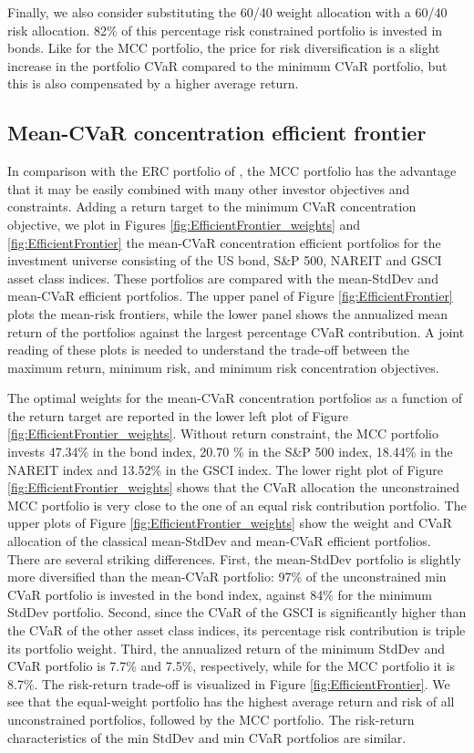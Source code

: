 \documentclass[12pt,a4paper]{article}
\begin{document}
Finally, we also consider substituting the 60/40 weight allocation with a 60/40 risk allocation.  82\% of this percentage risk constrained portfolio is invested in bonds. Like for the MCC portfolio, the price for risk diversification is a slight increase in the portfolio CVaR compared to the minimum CVaR portfolio, but this is also compensated by a higher average return.


\subsection{Mean-CVaR concentration efficient frontier}\label{subsec:efficientfrontiers}


In comparison with the ERC portfolio of \citet{Qian2005}, the MCC portfolio has the advantage that it may be easily combined with many other investor objectives and constraints. Adding a return target to the minimum CVaR concentration objective, we plot in  Figures \ref{fig:EfficientFrontier_weights}  and \ref{fig:EfficientFrontier}  the mean-CVaR concentration efficient portfolios for the investment universe consisting of the US bond, S\&P 500, NAREIT and GSCI asset class indices. These portfolios are compared with the mean-StdDev and mean-CVaR efficient portfolios. The upper panel of Figure \ref{fig:EfficientFrontier} plots the mean-risk frontiers, while the lower panel shows the annualized mean return of the portfolios against the largest percentage CVaR contribution. A joint reading of these plots is needed to understand the trade-off between the maximum return, minimum risk, and minimum risk concentration objectives.

The optimal weights for the mean-CVaR concentration portfolios as a function of the return target are reported in the lower left plot of Figure \ref{fig:EfficientFrontier_weights}. Without return constraint, the MCC portfolio invests 47.34\% in the bond index, 20.70 \% in the S\&P 500 index, 18.44\% in the NAREIT index and 13.52\% in the GSCI index. The lower right plot of Figure \ref{fig:EfficientFrontier_weights} shows that the CVaR allocation the unconstrained MCC portfolio is very close to the one of an equal risk contribution portfolio. The upper plots of Figure \ref{fig:EfficientFrontier_weights} show the weight and CVaR allocation of the classical mean-StdDev and mean-CVaR efficient portfolios. There are several striking differences. First, the mean-StdDev portfolio is slightly more diversified than the mean-CVaR portfolio: 97\% of the unconstrained min CVaR portfolio is invested in the bond index, against 84\% for the minimum StdDev portfolio. Second, since the CVaR of the GSCI is significantly higher than the CVaR of the other asset class indices, its percentage risk contribution is triple its portfolio weight.
Third, the annualized return of the minimum StdDev and CVaR portfolio is 7.7\% and 7.5\%, respectively, while for the MCC portfolio it is 8.7\%.
The risk-return trade-off is visualized in Figure \ref{fig:EfficientFrontier}. We see that the equal-weight portfolio has the highest average return and risk of all unconstrained portfolios, followed by the MCC portfolio. The risk-return characteristics of the min StdDev and min CVaR portfolios are similar.
\end{document}
